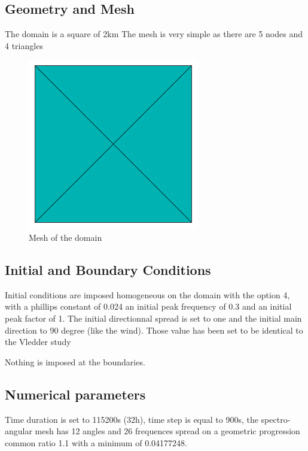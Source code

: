 \subsection{Geometry and Mesh}
%
The domain is a square of 2km
The mesh is very simple as there are 5 nodes and 4 triangles
\begin{figure} [!h]
\centering
\includegraphics[scale = 0.65]{maillage.png}
 \caption{Mesh of the domain}
\label{mailTW}
\end{figure}
%
%
\subsection{Initial and Boundary Conditions}
%
Initial conditions are imposed homogeneous on the domain with the option 4, with a phillips constant of 0.024 an initial peak frequency of 0.3  and an initial peak factor of 1.  The initial directionnal spread is set to one and the initial main direction to 90 degree (like the wind).
Those value has been set to be identical to the Vledder study \cite{Vanvledder1990}

Nothing is imposed at the boundaries.
%
%
\subsection{Numerical parameters}
Time duration is set to 115200s (32h), time step is equal to 900s, the spectro-angular mesh has 12 angles and 26 frequences spread on a geometric progression common ratio 1.1 with a minimum of 0.04177248.

%
%
